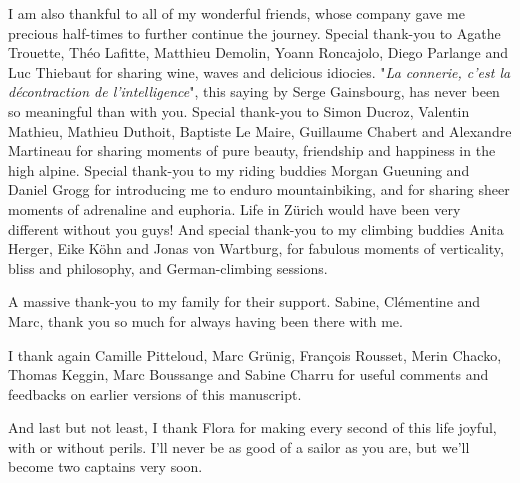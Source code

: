 I am also thankful to all of my wonderful friends, whose company gave me precious half-times to further continue the journey.
% 
Special thank-you to Agathe Trouette, Théo Lafitte, Matthieu Demolin, Yoann Roncajolo, Diego Parlange and Luc Thiebaut for sharing wine, waves and delicious idiocies. "\textit{La connerie, c'est la décontraction de l'intelligence}", this saying by Serge Gainsbourg, has never been so meaningful than with you.
% 
Special thank-you to Simon Ducroz, Valentin Mathieu, Mathieu Duthoit, Baptiste Le Maire, Guillaume Chabert and Alexandre Martineau for sharing moments of pure beauty, friendship and happiness in the high alpine.
% 
Special thank-you to my riding buddies Morgan Gueuning and Daniel Grogg for introducing me to enduro mountainbiking, and for sharing sheer moments of adrenaline and euphoria. Life in Zürich would have been very different without you guys! 
% 
And special thank-you to my climbing buddies Anita Herger, Eike Köhn and Jonas von Wartburg, for fabulous moments of verticality, bliss and philosophy, and German-climbing sessions.

A massive thank-you to my family for their support. Sabine, Clémentine and Marc, thank you so much for always having been there with me.

I thank again Camille Pitteloud, Marc Grünig, François Rousset, Merin Chacko, Thomas Keggin, Marc Boussange and Sabine Charru for useful comments and feedbacks on earlier versions of this manuscript.

% 
And last but not least, I thank Flora for making every second of this life joyful, with or without perils.
% 
I'll never be as good of a sailor as you are, but we'll become two captains very soon.











